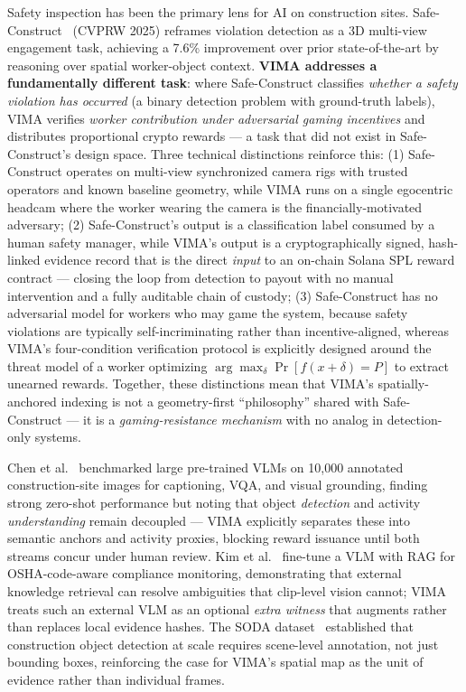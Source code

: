 \documentclass[sigconf,nonacm]{acmart}
\begin{document}
Safety inspection has been the primary lens for AI on construction sites.
Safe-Construct~\cite{chharia2025safeconstruct} (CVPRW 2025) reframes violation
detection as a 3D multi-view engagement task, achieving a 7.6\% improvement
over prior state-of-the-art by reasoning over spatial worker-object context.
\textbf{VIMA addresses a fundamentally different task}: where Safe-Construct
classifies \emph{whether a safety violation has occurred} (a binary detection
problem with ground-truth labels), VIMA verifies \emph{worker contribution
under adversarial gaming incentives} and distributes proportional crypto rewards
--- a task that did not exist in Safe-Construct's design space.
Three technical distinctions reinforce this: (1) Safe-Construct operates on
multi-view synchronized camera rigs with trusted operators and known baseline
geometry, while VIMA runs on a single egocentric headcam where the worker
wearing the camera is the financially-motivated adversary;
(2) Safe-Construct's output is a classification label consumed by a human
safety manager, while VIMA's output is a cryptographically signed, hash-linked
evidence record that is the direct \emph{input} to an on-chain Solana SPL
reward contract --- closing the loop from detection to payout with no manual
intervention and a fully auditable chain of custody;
(3) Safe-Construct has no adversarial model for workers who may game the system,
because safety violations are typically self-incriminating rather than
incentive-aligned, whereas VIMA's four-condition verification protocol is
explicitly designed around the threat model of a worker optimizing
$\arg\max_\delta \Pr[f(x+\delta) = P]$ to extract unearned rewards.
Together, these distinctions mean that VIMA's spatially-anchored indexing is
not a geometry-first ``philosophy'' shared with Safe-Construct --- it is a
\emph{gaming-resistance mechanism} with no analog in detection-only systems.

Chen et al.~\cite{chen2025vlm_construction} benchmarked large pre-trained VLMs
on 10,000 annotated construction-site images for captioning, VQA, and visual
grounding, finding strong zero-shot performance but noting that object
\emph{detection} and activity \emph{understanding} remain decoupled --- VIMA
explicitly separates these into semantic anchors and activity proxies, blocking
reward issuance until both streams concur under human review.
Kim et al.~\cite{kim2025optimizing} fine-tune a VLM with RAG for OSHA-code-aware
compliance monitoring, demonstrating that external knowledge retrieval can
resolve ambiguities that clip-level vision cannot; VIMA treats such an external
VLM as an optional \emph{extra witness} that augments rather than replaces local
evidence hashes.
The SODA dataset~\cite{soda2022} established that construction object detection
at scale requires scene-level annotation, not just bounding boxes, reinforcing
the case for VIMA's spatial map as the unit of evidence rather than individual
frames.
\end{document}
